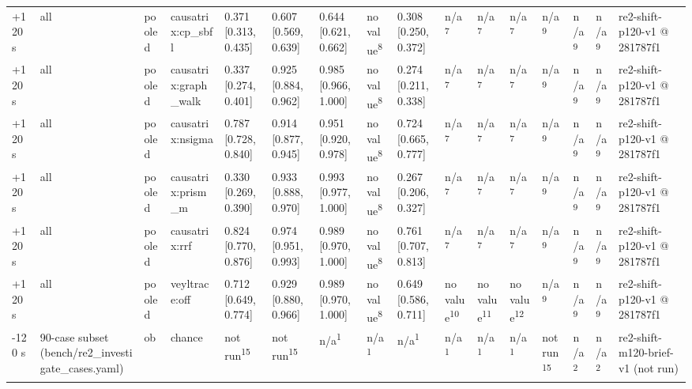 \begin{table}[t]
\begin{tabular}{llllllllllllllll}
+120 s & all & pooled & causatrix:cp\_sbfl & 0.371 [0.313, 0.435] & 0.607 [0.569, 0.639] & 0.644 [0.621, 0.662] & no value\textsuperscript{8} & 0.308 [0.250, 0.372] & n/a\textsuperscript{7} & n/a\textsuperscript{7} & n/a\textsuperscript{7} & n/a\textsuperscript{9} & n/a\textsuperscript{9} & n/a\textsuperscript{9} & re2-shift-p120-v1 @ 281787f1 \\
+120 s & all & pooled & causatrix:graph\_walk & 0.337 [0.274, 0.401] & 0.925 [0.884, 0.962] & 0.985 [0.966, 1.000] & no value\textsuperscript{8} & 0.274 [0.211, 0.338] & n/a\textsuperscript{7} & n/a\textsuperscript{7} & n/a\textsuperscript{7} & n/a\textsuperscript{9} & n/a\textsuperscript{9} & n/a\textsuperscript{9} & re2-shift-p120-v1 @ 281787f1 \\
+120 s & all & pooled & causatrix:nsigma & 0.787 [0.728, 0.840] & 0.914 [0.877, 0.945] & 0.951 [0.920, 0.978] & no value\textsuperscript{8} & 0.724 [0.665, 0.777] & n/a\textsuperscript{7} & n/a\textsuperscript{7} & n/a\textsuperscript{7} & n/a\textsuperscript{9} & n/a\textsuperscript{9} & n/a\textsuperscript{9} & re2-shift-p120-v1 @ 281787f1 \\
+120 s & all & pooled & causatrix:prism\_m & 0.330 [0.269, 0.390] & 0.933 [0.888, 0.970] & 0.993 [0.977, 1.000] & no value\textsuperscript{8} & 0.267 [0.206, 0.327] & n/a\textsuperscript{7} & n/a\textsuperscript{7} & n/a\textsuperscript{7} & n/a\textsuperscript{9} & n/a\textsuperscript{9} & n/a\textsuperscript{9} & re2-shift-p120-v1 @ 281787f1 \\
+120 s & all & pooled & causatrix:rrf & 0.824 [0.770, 0.876] & 0.974 [0.951, 0.993] & 0.989 [0.970, 1.000] & no value\textsuperscript{8} & 0.761 [0.707, 0.813] & n/a\textsuperscript{7} & n/a\textsuperscript{7} & n/a\textsuperscript{7} & n/a\textsuperscript{9} & n/a\textsuperscript{9} & n/a\textsuperscript{9} & re2-shift-p120-v1 @ 281787f1 \\
+120 s & all & pooled & veyltrace:off & 0.712 [0.649, 0.774] & 0.929 [0.880, 0.966] & 0.989 [0.970, 1.000] & no value\textsuperscript{8} & 0.649 [0.586, 0.711] & no value\textsuperscript{10} & no value\textsuperscript{11} & no value\textsuperscript{12} & n/a\textsuperscript{9} & n/a\textsuperscript{9} & n/a\textsuperscript{9} & re2-shift-p120-v1 @ 281787f1 \\
-120 s & 90-case subset (bench/re2\_investigate\_cases.yaml) & ob & chance & not run\textsuperscript{15} & not run\textsuperscript{15} & n/a\textsuperscript{1} & n/a\textsuperscript{1} & n/a\textsuperscript{1} & n/a\textsuperscript{1} & n/a\textsuperscript{1} & n/a\textsuperscript{1} & not run\textsuperscript{15} & n/a\textsuperscript{2} & n/a\textsuperscript{2} & re2-shift-m120-brief-v1 (not run) \\

\end{tabular}
\end{table}
